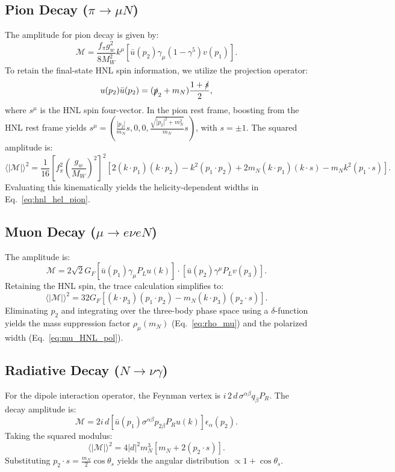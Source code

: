 \documentclass{article}
\begin{document}
\subsection{Pion Decay ($\pi \to \mu N$)}
The amplitude for pion decay is given by:
\begin{equation}
  \mathcal{M} = \frac{f_\pi g_w^2}{8 M_W^2} k^\mu [\bar{u}(p_2) \gamma_\mu (1 - \gamma^5) v(p_1)].
\end{equation}
To retain the final-state HNL spin information, we utilize the projection operator:
\begin{equation}
  u(p_2) \bar{u}(p_2) = (\slashed{p}_2 + m_N) \frac{1 + \slashed{s}}{2},
\end{equation}
where $s^\mu$ is the HNL spin four-vector. In the pion rest frame, boosting from the HNL rest frame yields $s^\mu = \left(\frac{|p_2|}{m_N} s, 0, 0, \frac{\sqrt{|p_2|^2 + m_N^2}}{m_N} s\right)$, with $s = \pm 1$. The squared amplitude is:
\begin{equation}
  \langle |\mathcal{M}| \rangle^2 = \frac{1}{16} \left[ f_\pi^2 \left( \frac{g_w}{M_W} \right)^2 \right]^2 [ 2 (k \cdot p_1) (k \cdot p_2) - k^2 (p_1 \cdot p_2) + 2 m_N (k \cdot p_1) (k \cdot s) - m_N k^2 (p_1 \cdot s) ].
\end{equation}
Evaluating this kinematically yields the helicity-dependent widths in Eq.~\ref{eq:hnl_hel_pion}.

\subsection{Muon Decay ($\mu \to e \nu e N$)}
The amplitude is:
\begin{equation}
  \mathcal{M} = 2\sqrt{2} G_F [\bar{u}(p_1) \gamma_\mu P_L u(k)] \cdot [\bar{u}(p_2) \gamma^\mu P_L v(p_3) ].
\end{equation}
Retaining the HNL spin, the trace calculation simplifies to:
\begin{equation}
  \langle |\mathcal{M}| \rangle^2 = 32 G_F [(k \cdot p_3)(p_1 \cdot p_2) - m_N (k \cdot p_3) (p_2 \cdot s)].
\end{equation}
Eliminating $p_2$ and integrating over the three-body phase space using a $\delta$-function yields the mass suppression factor $\rho_\mu(m_N)$ (Eq.~\ref{eq:rho_mu}) and the polarized width (Eq.~\ref{eq:mu_HNL_pol}).

\subsection{Radiative Decay ($N \to \nu \gamma$)}
For the dipole interaction operator, the Feynman vertex is $i \, 2 \, d \, \sigma^{\alpha\beta} q_\beta P_R$. The decay amplitude is:
\begin{equation}
  \mathcal{M} = 2i \, d [\bar{u}(p_1) \sigma^{\alpha\beta} p_{2\beta} P_R u(k)] \epsilon_\alpha(p_2).
\end{equation}
Taking the squared modulus:
\begin{equation}
  \langle |\mathcal{M}| \rangle^2 = 4 |d|^2 m_N^3 [m_N + 2 (p_2 \cdot s)].
\end{equation}
Substituting $p_2 \cdot s = \frac{m_N}{2} \cos{\theta_s}$ yields the angular distribution $\propto 1 + \cos{\theta_s}$.



\end{document}
